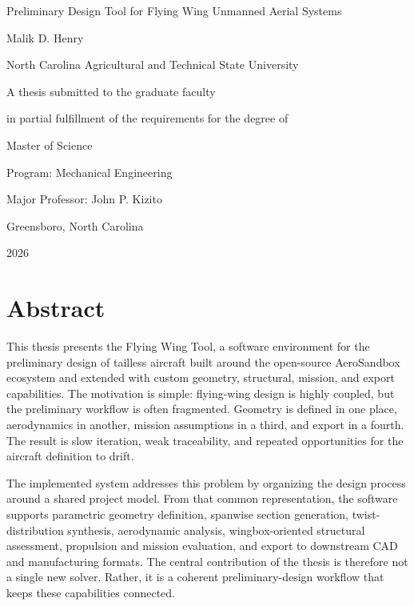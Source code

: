 \documentclass[12pt]{report}
\begin{document}
\begin{titlepage}
  \centering
  {\Large Preliminary Design Tool for Flying Wing Unmanned Aerial Systems\par}
  \vspace{1.25in}
  {\large Malik D. Henry\par}
  \vspace{0.6in}
  {\large North Carolina Agricultural and Technical State University\par}
  \vspace{0.4in}
  {\large A thesis submitted to the graduate faculty\par}
  {\large in partial fulfillment of the requirements for the degree of\par}
  \vspace{0.4in}
  {\large Master of Science\par}
  {\large Program: Mechanical Engineering\par}
  \vspace{0.4in}
  {\large Major Professor: John P. Kizito\par}
  \vfill
  {\large Greensboro, North Carolina\par}
  {\large 2026\par}
\end{titlepage}


\chapter*{Abstract}
This thesis presents the Flying Wing Tool, a software environment for the preliminary design of tailless aircraft built around the open-source AeroSandbox ecosystem and extended with custom geometry, structural, mission, and export capabilities. The motivation is simple: flying-wing design is highly coupled, but the preliminary workflow is often fragmented. Geometry is defined in one place, aerodynamics in another, mission assumptions in a third, and export in a fourth. The result is slow iteration, weak traceability, and repeated opportunities for the aircraft definition to drift.

The implemented system addresses this problem by organizing the design process around a shared project model. From that common representation, the software supports parametric geometry definition, spanwise section generation, twist-distribution synthesis, aerodynamic analysis, wingbox-oriented structural assessment, propulsion and mission evaluation, and export to downstream CAD and manufacturing formats. The central contribution of the thesis is therefore not a single new solver. Rather, it is a coherent preliminary-design workflow that keeps these capabilities connected.
\end{document}
